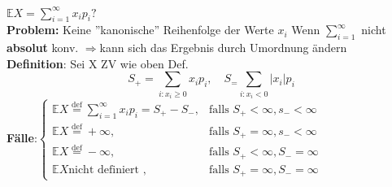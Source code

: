 $\mathds{E}X=\sum_{i=1}^\infty x_ip_i ?$ \\
\textbf{Problem:} Keine ''kanonische'' Reihenfolge der Werte $x_i$ Wenn $\sum_{i=1}^\infty$ nicht \textbf{absolut} konv. $\Rightarrow$kann sich das Ergebnis durch Umordnung ändern\medskip\\
\textbf{Definition}: Sei X ZV wie oben Def.
$$S_+ = \sum_{i:x_i \geq 0}x_ip_i,\quad S_ = \sum_{i:x_i < 0}|x_i|p_i$$
\textbf{Fälle}:$
\begin{cases}
	 \mathds{E}X\overset{\text{def}}{=}\sum_{i=1}^\infty x_ip_i = S_+-S_-,  &\text{falls }S_+ < \infty, s_- < \infty\\
	 \mathds{E}X\overset{\text{def}}{=}+\infty,&\text{falls } S_+=\infty, s_- < \infty\\
	\mathds{E}X \overset{\text{def}}{=}-\infty,&\text{falls } S_+ < \infty, S_- = \infty\\
\mathds{E}X \text{nicht definiert }, & \text{falls } S_+ = \infty, S_-=\infty
\end{cases}$
